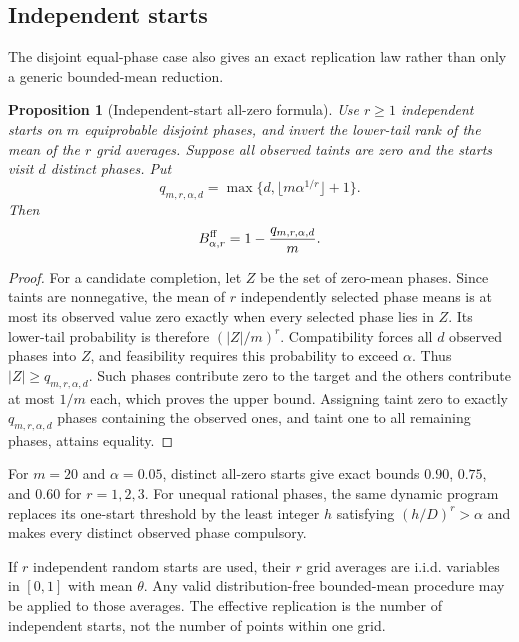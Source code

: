 \documentclass[11pt]{article}
\newtheorem{proposition}[theorem]{Proposition}
\theoremstyle{definition}
\begin{document}
\subsection{Independent starts}

The disjoint equal-phase case also gives an exact replication law rather than
only a generic bounded-mean reduction.

\begin{proposition}[Independent-start all-zero formula]
\label{prop:multistartzero}
Use $r\ge1$ independent starts on $m$ equiprobable disjoint phases, and
invert the lower-tail rank of the mean of the $r$ grid averages. Suppose all
observed taints are zero and the starts visit $d$ distinct phases. Put
\[
 q_{m,r,\alpha,d}
 =\max\{d,\lfloor m\alpha^{1/r}\rfloor+1\}.
\]
Then
\begin{equation}\label{eq:multistartzero}
 B^{\rm ff}_{\alpha,r}=1-\frac{q_{m,r,\alpha,d}}m.
\end{equation}
\end{proposition}

\begin{proof}
For a candidate completion, let $Z$ be the set of zero-mean phases. Since
taints are nonnegative, the mean of $r$ independently selected phase means is
at most its observed value zero exactly when every selected phase lies in
$Z$. Its lower-tail probability is therefore $(|Z|/m)^r$. Compatibility
forces all $d$ observed phases into $Z$, and feasibility requires this
probability to exceed $\alpha$. Thus $|Z|\ge q_{m,r,\alpha,d}$. Such phases
contribute zero to the target and the others contribute at most $1/m$ each,
which proves the upper bound. Assigning taint zero to exactly
$q_{m,r,\alpha,d}$ phases containing the observed ones, and taint one to all
remaining phases, attains equality.
\end{proof}

For $m=20$ and $\alpha=0.05$, distinct all-zero starts give exact bounds
$0.90$, $0.75$, and $0.60$ for $r=1,2,3$. For unequal rational phases, the
same dynamic program replaces its one-start threshold by the least integer
$h$ satisfying $(h/D)^r>\alpha$ and makes every distinct observed phase
compulsory.

If $r$ independent random starts are used, their $r$ grid averages are i.i.d.
variables in $[0,1]$ with mean $\theta$. Any valid distribution-free
bounded-mean procedure may be applied to those averages. The effective
replication is the number of independent starts, not the number of points
within one grid.
\end{document}
